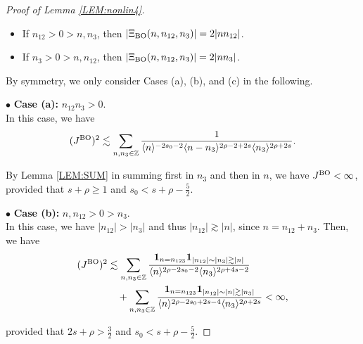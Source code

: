 \documentclass[letterpaper, 11pt,  reqno]{amsart}
\newcommand{\1}{\hspace{0.5mm}\text{I}\hspace{0.5mm}}
\newcommand{\noi}{\noindent}
\newcommand{\Z}{\mathbb{Z}}
\newcommand{\bul}{\bullet}
\newcommand{\les}{\lesssim}
\newcommand{\ges}{\gtrsim}
\newcommand{\jb}[1]
{\langle #1 \rangle}
\newcommand{\ind}{\mathbf 1}
\newcommand{\BO}{\text{\rm BO} }
\numberwithin{equation}{section}
\numberwithin{theorem}{section}
\begin{document}
\begin{proof}[Proof of Lemma \ref{LEM:nonlin4}]
\begin{itemize}
\smallskip


\item[(d)]
If $n_{12}>0>n, n_3$,  then  $|\Xi_\BO(n, n_{12}, n_3)|=2|n n_{12}|$.



\smallskip


\item[(e)]
If $n_3>0>n, n_{12}$,  then  $|\Xi_\BO(n, n_{12}, n_3)|=2|n n_3|$.

\end{itemize}


\smallskip


\noi
By symmetry, 
we only consider Cases (a), (b),  and (c) in the following.



\medskip

\noi
$\bul$ {\bf Case (a):} $n_{12} n_3 >0$.\\
\indent
In this case, we have
\begin{align*}
( J^\BO)^2
\les  \sum_{n,  n_3 \in \Z}
\frac{1}
{\jb{n}^{-2s_0 - 2}
\jb{n - n_3}^{2\rho-2+2s}
\jb{n_3}^{2\rho+2s}} .
\end{align*}



\noi
By
Lemma \ref{LEM:SUM}
in summing first in $n_3$ and then in $n$, we have $J^\BO < \infty$, 
provided that 
$s + \rho  \ge 1$ and $s_0 < s + \rho - \frac 52$.












\medskip

\noi
$\bul$ {\bf Case (b):} $n, n_{12}>0>n_3$.\\
\indent
In this case, we have $|n_{12}| > |n_3|$ and thus $|n_{12}| \ges |n|$,
since $n = n_{12} + n_3$.
Then,  we have
\begin{align*}
 (J^\BO)^2
& \les  
\sum_{n,  n_3 \in \Z}
\frac{\ind_{n = n_{123}}\ind_{|n_{12}|\sim |n_3| \ges |n|}}
{\jb{n}^{2\rho-2s_0 - 2}
\jb{n_3}^{2\rho+4s - 2}} \\
& \quad + \sum_{n,  n_3 \in \Z}
\frac{\ind_{n = n_{123}}\ind_{|n_{12}|\sim |n| \ges |n_3|}}
{\jb{n}^{2\rho-2s_0 +2s- 4}
\jb{n_3}^{2\rho+2s}} 
< \infty, 
\end{align*}



\noi
provided that 
$2s + \rho  > \frac 32$ and $s_0 < s + \rho - \frac 52$.

\medskip


\end{proof}
\end{document}
